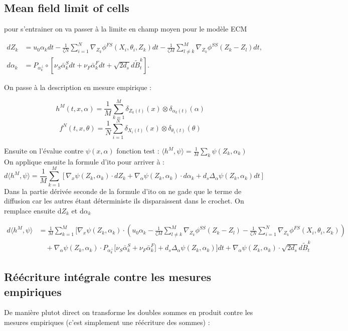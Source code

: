\documentclass{article}
\begin{document}
\subsection{Mean field limit of cells}
pour s'entrainer on va passer à la limite en champ moyen pour le modèle ECM

\begin{align}
d Z_k &= u_0 \alpha_k dt - \frac{1}{\zeta N} \sum_{i=1}^N \nabla_{Z_k} \phi^{FS} (X_i, \theta_i, Z_k) dt - \frac{1}{\zeta M} \sum_{l \neq k}^M \nabla_{Z_k} \phi^{SS} (Z_k - Z_l) dt, \tag{1a} \\
    d \alpha_k &= P_{\alpha_k^\perp} \circ \left[ \nu_S \bar{\alpha}_k^S dt + \nu_F \bar{\alpha}_k^F dt + \sqrt{2d_s} d \tilde{B}_t^k \right]. \tag{1b}
\end{align}

On passe à la description en mesure empirique :

$$h^M(t, x, \alpha) = \frac{1}{M} \sum_{k=1}^M \delta_{Z_k(t)}(x) \otimes \delta_{\alpha_k(t)}(\alpha)$$
$$f^N(t, x, \theta) = \frac{1}{N} \sum_{i=1}^N \delta_{X_i(t)}(x) \otimes \delta_{\theta_i(t)}(\theta)$$

Ensuite on l'évalue contre $\psi(x,\alpha)$ fonction test :  $\langle h^M, \psi \rangle = \frac{1}{M}\sum_k \psi(Z_k, \alpha_k)$\\
On applique ensuite la formule d'ito pour arriver à :
$$d \langle h^M, \psi \rangle = \frac{1}{M} \sum_{k=1}^M \left[ \nabla_x \psi(Z_k, \alpha_k) \cdot dZ_k + \nabla_\alpha \psi(Z_k, \alpha_k) \cdot d\alpha_k + d_s \Delta_\alpha \psi(Z_k, \alpha_k) dt \right]$$
Dans la partie dérivée seconde de la formule d'ito on ne gade que le terme de diffusion car les autres étant déterministe ils disparaissent dans le crochet.
On remplace ensuite d$Z_k$ et d$\alpha_k$

\begin{align*}
d \langle h^M, \psi \rangle &= \frac{1}{M} \sum_{k=1}^M \Bigg[ \nabla_x \psi(Z_k, \alpha_k) \cdot \left( u_0 \alpha_k - \frac{1}{\zeta M} \sum_{l \neq k}^M \nabla_{Z_k} \phi^{SS}(Z_k - Z_l) - \frac{1}{\zeta N} \sum_{i=1}^N \nabla_{Z_k} \phi^{FS}(X_i, \theta_i, Z_k) \right) \\
&\quad + \nabla_\alpha \psi(Z_k, \alpha_k) \cdot P_{\alpha_k^\perp} \big[ \nu_S \bar{\alpha}_k^S + \nu_F \bar{\alpha}_k^F \big] + d_s \Delta_\alpha \psi(Z_k, \alpha_k) \Bigg] dt + \nabla_\alpha \psi(Z_k, \alpha_k) \cdot \sqrt{2d_s} d\tilde{B}_t^k
\end{align*}

\subsection{Réécriture intégrale contre les mesures empiriques}
De manière plutot direct on transforme les doubles sommes en produit contre les mesures empiriques (c'est simplement une réécriture des sommes) :
\end{document}
